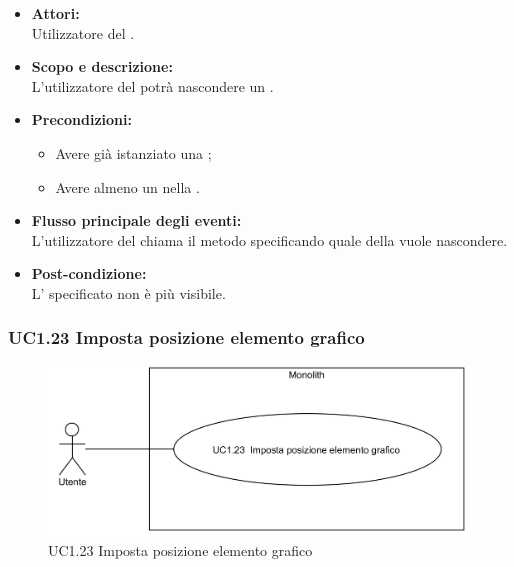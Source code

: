 \begin{itemize}
	\item \textbf{Attori:}
	\\Utilizzatore del .
	\item \textbf{Scopo e descrizione:} 
	\\L'utilizzatore del  potrà nascondere un .
	\item \textbf{Precondizioni:}
	\begin{itemize}
		\item Avere già istanziato una ;
		\item Avere almeno un  nella .
	\end{itemize}
	\item \textbf{Flusso principale degli eventi:}
	\\L'utilizzatore del  chiama il metodo specificando quale  della  vuole nascondere.
	\item \textbf{Post-condizione:}
	\\L' specificato non è più visibile.
\end{itemize}

\subsubsection{UC1.23 Imposta posizione elemento grafico} \label{UC1.23}

\begin{figure}[H]
	\centering
	\includegraphics[width=15cm]{../../documenti/AnalisiDeiRequisiti/Diagrammi_img/uc1_23.png}
	\caption{UC1.23 Imposta posizione elemento grafico}
\end{figure}

